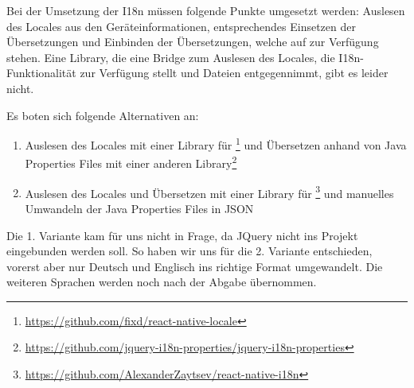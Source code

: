 Bei der Umsetzung der I18n müssen folgende Punkte umgesetzt werden: Auslesen des Locales aus den Geräteinformationen, entsprechendes Einsetzen der Übersetzungen und Einbinden der Übersetzungen, welche auf  zur Verfügung stehen.
Eine Library, die eine  Bridge zum Auslesen des Locales, die I18n-Funktionalität zur Verfügung stellt und  Dateien entgegennimmt, gibt es leider nicht.

Es boten sich folgende Alternativen an:
\begin{enumerate}
\item Auslesen des Locales mit einer Library für \footnote{\url{https://github.com/fixd/react-native-locale}} und Übersetzen anhand von Java Properties Files mit einer anderen Library\footnote{\url{https://github.com/jquery-i18n-properties/jquery-i18n-properties}}
\item Auslesen des Locales und Übersetzen mit einer Library für \footnote{\url{https://github.com/AlexanderZaytsev/react-native-i18n}} und manuelles Umwandeln der Java Properties Files in JSON
\end{enumerate}

Die 1. Variante kam für uns nicht in Frage, da JQuery nicht ins Projekt eingebunden werden soll.
So haben wir uns für die 2. Variante entschieden, vorerst aber nur Deutsch und Englisch ins richtige Format umgewandelt.
Die weiteren Sprachen werden noch nach der Abgabe übernommen.
